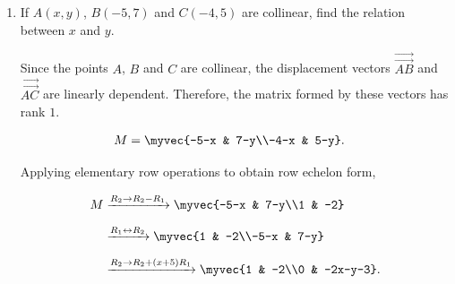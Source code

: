 \begin{enumerate}[label=\thesubsection.\arabic*, ref=\thesubsection.\theenumi]
		\begin{align*}
			x[n] &= (1+5(n-1))u(n-1)\\
			&= (5n-4)u(n-1).
		\end{align*}
		
		\[
u(n-1) =
\begin{cases}
1, & n \geq 1,\\
0, & \text{otherwise}.
\end{cases}
\]

	      Verifying the given conditions,
	      \begin{align*}
		      S_5 &=5(1)+10(5)=55,\\
		      S_7 &=7(1)+21(5)=112,\\
		      S_5+S_7 &=55+112=167,\\
		      S_{10} &=10(1)+45(5)=235.
	      \end{align*}

	      Both conditions are satisfied. The following code verifies the solution.
	      \begin{lstlisting}[frame=single, basicstyle=\rmfamily, escapeinside={(*@}{@*)}]
(*@\makebox[\dimexpr\linewidth-2\fboxsep-2\fboxrule\relax][c]{codes/C10/Q08.py}@*)
\end{lstlisting}

    \item
    \label{question:C10-Q10}
    \label{question-short:C10-Q10} If $A(x,y)$, $B(-5,7)$ and $C(-4,5)$ are collinear, find the relation between $x$ and $y$.

    \par
    \smallskip
    \solution

     Since the points $A$, $B$ and $C$ are collinear, the displacement vectors
	      $\overrightarrow{\vec{AB}}$ and $\overrightarrow{\vec{AC}}$ are linearly dependent.
	      Therefore, the matrix formed by these vectors has rank $1$.

	      \begin{align*}
		      M &= \myvec{-5-x & 7-y\\-4-x & 5-y}.
	      \end{align*}

	      Applying elementary row operations to obtain row echelon form,

	      \begin{align*}
		      M &\xrightarrow{R_2\rightarrow R_2-R_1}
		      \myvec{-5-x & 7-y\\1 & -2}\\[6pt]
		        &\xrightarrow{R_1\leftrightarrow R_2}
		      \myvec{1 & -2\\-5-x & 7-y}\\[6pt]
		        &\xrightarrow{R_2\rightarrow R_2+(x+5)R_1}
		      \myvec{1 & -2\\0 & -2x-y-3}.
	      \end{align*}


\end{enumerate}
